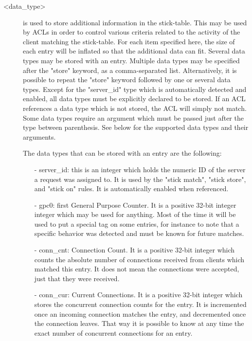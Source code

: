 \begin{description}
   \item[<data\_type>] is used to store additional information in the stick-table. This
               may be used by ACLs in order to control various criteria related
               to the activity of the client matching the stick-table. For each
               item specified here, the size of each entry will be inflated so
               that the additional data can fit. Several data types may be
               stored with an entry. Multiple data types may be specified after
               the "store" keyword, as a comma-separated list. Alternatively,
               it is possible to repeat the "store" keyword followed by one or
               several data types. Except for the "server\_id" type which is
               automatically detected and enabled, all data types must be
               explicitly declared to be stored. If an ACL references a data
               type which is not stored, the ACL will simply not match. Some
               data types require an argument which must be passed just after
               the type between parenthesis. See below for the supported data
               types and their arguments.

  The data types that can be stored with an entry are the following:
  \begin{itemize}
  \item[-] server\_id: this is an integer which holds the numeric ID of the server a
      request was assigned to. It is used by the "stick match", "stick store",
      and "stick on" rules. It is automatically enabled when referenced.

  \item[-] gpc0: first General Purpose Counter. It is a positive 32-bit integer
      integer which may be used for anything. Most of the time it will be used
      to put a special tag on some entries, for instance to note that a
      specific behavior was detected and must be known for future matches.

  \item[-] conn\_cnt: Connection Count. It is a positive 32-bit integer which counts
      the absolute number of connections received from clients which matched
      this entry. It does not mean the connections were accepted, just that
      they were received.

  \item[-] conn\_cur: Current Connections. It is a positive 32-bit integer which
      stores the concurrent connection counts for the entry. It is incremented
      once an incoming connection matches the entry, and decremented once the
      connection leaves. That way it is possible to know at any time the exact
      number of concurrent connections for an entry.


\end{itemize}
\end{description}
